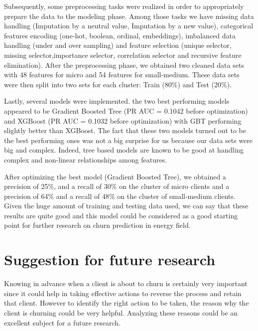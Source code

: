 \documentclass[LaM,binding=0.6cm, english]{sapthesis}
\begin{document}
Subsequently, some preprocessing tasks were realized in order to appropriately prepare the data to the modeling phase. Among those tasks we have missing data handling (Imputation by a neutral value, Imputation by a new value), categorical features encoding (one-hot, boolean, ordinal, embeddings), imbalanced data handling (under and over sampling) and feature selection (unique selector, missing selector,importance selector, correlation selector and recursive feature elimination). After the preprocessing phase, we obtained two cleaned data sets with 48 features for micro and 54 features for small-medium. These data sets were then split into two sets for each cluster: Train (80\%) and Test (20\%).

Lastly, several models were implemented. the two best performing models appeared to be Gradient Boosted Tree (PR AUC = 0.1042 before optimization) and XGBoost (PR AUC = 0.1032 before optimization) with GBT performing slightly better than XGBoost. The fact that these two models turned out to be the best performing ones was not a big surprise for us because our data sets were big and complex. Indeed, tree based models are known to be good at handling complex and non-linear relationships among features.

After optimizing the best model (Gradient Boosted Tree), we obtained a precision of 25\%, and a recall of 30\% on the cluster of micro clients and a precision of 64\% and a recall of 48\% on the cluster of small-medium clients. Given the huge amount of training and testing data used, we can say that these results are quite good and this model could be considered as a good starting point for further research on churn prediction in energy field.

\section{Suggestion for future research}

Knowing in advance when a client is about to churn is certainly very important since it could help in taking effective actions to reverse the process and retain that client. However to identify the right action to be taken, the reason why the client is churning could be very helpful. Analyzing these reasons could be an excellent subject for a future research.

\backmatter
\end{document}
